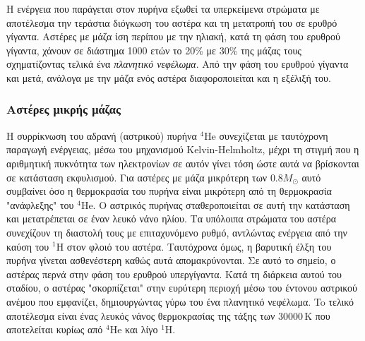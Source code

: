  Η ενέργεια που παράγεται στον πυρήνα εξωθεί τα υπερκείμενα στρώματα με αποτέλεσμα την τεράστια διόγκωση του αστέρα και τη μετατροπή του σε ερυθρό γίγαντα. Αστέρες με μάζα ίση περίπου με την ηλιακή, κατά τη φάση του ερυθρού γίγαντα, χάνουν σε διάστημα 1000 ετών το 20\% με 30\% της μάζας τους σχηματίζοντας τελικά ένα \textit{πλανητικό νεφέλωμα}. Από την φάση του ερυθρού γίγαντα και μετά, ανάλογα με την μάζα ενός αστέρα διαφοροποιείται και η εξέλιξή του. 
\subsubsection{Αστέρες μικρής μάζας}
H συρρίκνωση του αδρανή (αστρικού) πυρήνα $^4$He συνεχίζεται με ταυτόχρονη παραγωγή ενέργειας, μέσω του μηχανισμού Kelvin-Helmholtz, μέχρι τη στιγμή που η αριθμητική πυκνότητα των ηλεκτρονίων σε αυτόν γίνει τόση ώστε αυτά να βρίσκονται σε κατάσταση εκφυλισμού. Για αστέρες με μάζα μικρότερη των $0.8 M_{\odot}$ αυτό συμβαίνει όσο η θερμοκρασία του πυρήνα είναι μικρότερη από τη θερμοκρασία "ανάφλεξης" του $^4$He. Ο αστρικός πυρήνας σταθεροποιείται σε αυτή την κατάσταση και μετατρέπεται σε έναν λευκό νάνο ηλίου. Τα υπόλοιπα στρώματα του αστέρα συνεχίζουν τη διαστολή τους με επιταχυνόμενο ρυθμό,  αντλώντας ενέργεια από την καύση του $^1$H στον φλοιό του αστέρα. Ταυτόχρονα όμως, η βαρυτική έλξη του πυρήνα γίνεται ασθενέστερη καθώς αυτά απομακρύνονται. Σε αυτό το σημείο, ο αστέρας περνά στην φάση του ερυθρού υπεργίγαντα. Κατά τη διάρκεια αυτού του σταδίου, ο αστέρας "σκορπίζεται" στην ευρύτερη περιοχή μέσω του έντονου αστρικού ανέμου που εμφανίζει, δημιουργώντας γύρω του ένα πλανητικό νεφέλωμα. To τελικό αποτέλεσμα είναι ένας λευκός νάνος θερμοκρασίας της τάξης των $30000 \,\text{K}$ που αποτελείται κυρίως από $^4$He και λίγο $^1$H.

